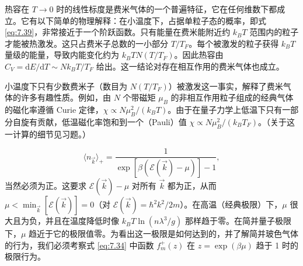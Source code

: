 
热容在 $T\to0$ 时的线性标度是费米气体的一个普遍特征，它在任何维数下都成立。它有以下简单的物理解释：在小温度下，占据单粒子态的概率，即式 \eqref{eq:7.39}，非常接近于一个阶跃函数。只有能量在费米能附近约 $k_BT$ 范围内的粒子才能被热激发。这只占费米子总数的一小部分 $T/T_F$。每个被激发的粒子获得 $k_BT$ 量级的能量，导致内能变化约为 $k_BTN(T/T_F)$。因此热容由 $C_V=\mathrm dE/\mathrm dT\sim Nk_BT/T_F$ 给出。这一结论对存在相互作用的费米气体也成立。


小温度下只有少数费米子（数目为 $N(T/T_F)$）被激发这一事实，解释了费米气体的许多有趣性质。例如，由 $N$ 个带磁矩 $\mu_B$ 的非相互作用粒子组成的经典气体的磁化率遵循 Curie 定律，$\chi\propto N\mu_B^2/(k_BT)$。由于在量子力学上低温下只有一部分自旋有贡献，低温磁化率饱和到一个（Pauli）值 $\chi\propto N\mu_B^2/(k_BT_F)$。（关于这一计算的细节见习题。）


\begin{equation}\label{eq:7.49}
\langle n_{\vec k}\rangle_+=\frac1{\exp\left[\beta\left(\mathcal E(\vec k)-\mu\right)\right]-1},
\end{equation}
当然必须为正。这要求 $\mathcal E(\vec k)-\mu$ 对所有 $\vec k$ 都为正，从而 $\mu<\min_{\vec k}\left[\mathcal E(\vec k)\right]=0$（对 $\mathcal E(\vec k)=\hbar^2k^2/2m$）。在高温（经典极限）下，$\mu$ 很大且为负，并且在温度降低时像 $k_BT\ln(n\lambda^3/g)$ 那样趋于零。在简并量子极限下，$\mu$ 趋近于它的极限值零。为看出这一极限是如何达到的，并了解简并玻色气体的行为，我们必须考察式 \eqref{eq:7.34} 中函数 $f_m^+(z)$ 在 $z=\exp(\beta\mu)$ 趋于 1 时的极限行为。


